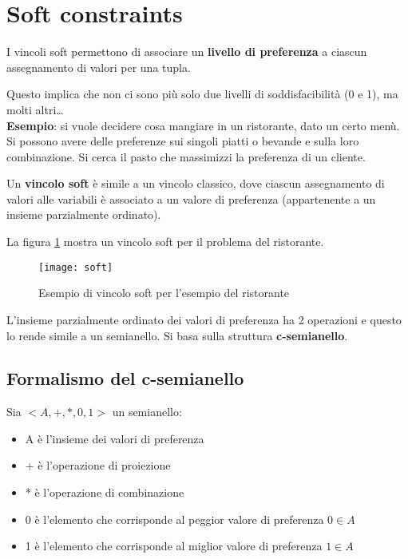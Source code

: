 \newpage

\section{Soft constraints}

I vincoli soft permettono di associare un \textbf{livello di preferenza} a
ciascun assegnamento di valori per una tupla.

Questo implica che non ci sono più solo due livelli di soddisfacibilità
(0 e 1), ma molti altri\dots\\

\textbf{Esempio}: si vuole decidere cosa mangiare in un ristorante, dato
un certo menù. Si possono avere delle preferenze sui singoli piatti o
bevande e sulla loro combinazione. Si cerca il pasto che massimizzi
la preferenza di un cliente.

Un \textbf{vincolo soft} è simile a un vincolo classico, dove ciascun
assegnamento di valori alle variabili è associato a un valore di
preferenza (appartenente a un insieme parzialmente ordinato).

La figura \ref{fig:soft} mostra un vincolo soft per il problema del
ristorante.

\begin{figure}[H]
\centering
\texttt{[image: soft]}
\caption{Esempio di vincolo soft per l'esempio del ristorante}
\label{fig:soft}
\end{figure}

L'insieme parzialmente ordinato dei valori di preferenza ha 2 operazioni e
questo lo rende simile a un semianello. Si basa sulla struttura
\textbf{c-semianello}.

\subsection{Formalismo del c-semianello}

Sia $<A, +, *, 0, 1>$ un semianello:

\begin{itemize}
 \item A è l'insieme dei valori di preferenza
 \item + è l'operazione di proiezione
 \item * è l'operazione di combinazione
 \item 0 è l'elemento che corrisponde al peggior valore di preferenza $0 \in A$
 \item 1 è l'elemento che corrisponde al miglior valore di preferenza $1 \in A$
\end{itemize}
